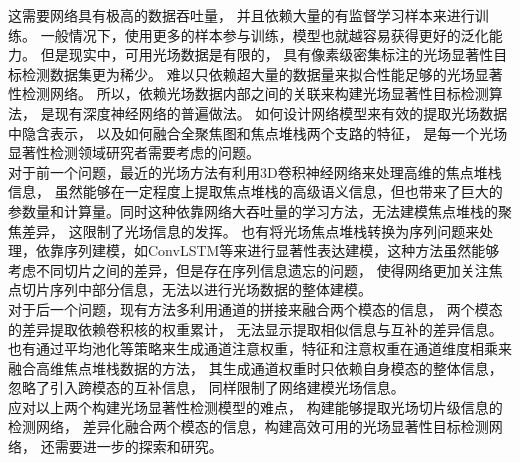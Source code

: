 这需要网络具有极高的数据吞吐量，
并且依赖大量的有监督学习样本来进行训练。
一般情况下，使用更多的样本参与训练，模型也就越容易获得更好的泛化能力。
但是现实中，可用光场数据是有限的，
具有像素级密集标注的光场显著性目标检测数据集更为稀少。
难以只依赖超大量的数据量来拟合性能足够的光场显著性检测网络。
所以，依赖光场数据内部之间的关联来构建光场显著性目标检测算法，
是现有深度神经网络的普遍做法。
如何设计网络模型来有效的提取光场数据中隐含表示，
以及如何融合全聚焦图和焦点堆栈两个支路的特征，
是每一个光场显著性检测领域研究者需要考虑的问题。
\\
%
%
%
%
\indent
对于前一个问题，最近的光场方法有利用3D卷积神经网络来处理高维的焦点堆栈信息，
虽然能够在一定程度上提取焦点堆栈的高级语义信息，但也带来了巨大的参数量和计算量。同时这种依靠网络大吞吐量的学习方法，无法建模焦点堆栈的聚焦差异，
这限制了光场信息的发挥。
也有将光场焦点堆栈转换为序列问题来处理，依靠序列建模，如ConvLSTM等来进行显著性表达建模，这种方法虽然能够考虑不同切片之间的差异，但是存在序列信息遗忘的问题，
使得网络更加关注焦点切片序列中部分信息，无法以进行光场数据的整体建模。
\\
%
%
%
%
\indent
对于后一个问题，现有方法多利用通道的拼接来融合两个模态的信息，
两个模态的差异提取依赖卷积核的权重累计，
无法显示提取相似信息与互补的差异信息。
也有通过平均池化等策略来生成通道注意权重，特征和注意权重在通道维度相乘来融合高维焦点堆栈数据的方法，
其生成通道权重时只依赖自身模态的整体信息，忽略了引入跨模态的互补信息，
同样限制了网络建模光场信息。
\\
%
%
%
%
\indent
应对以上两个构建光场显著性检测模型的难点，
构建能够提取光场切片级信息的检测网络，
差异化融合两个模态的信息，构建高效可用的光场显著性目标检测网络，
还需要进一步的探索和研究。


